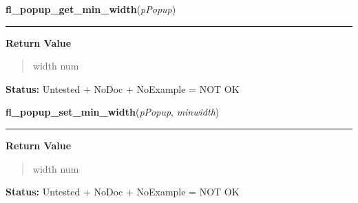     \label{xformslib:library:fl_popup_get_min_width}

    \vspace{0.5ex}

\hspace{.8\funcindent}\begin{boxedminipage}{\funcwidth}

    \raggedright \textbf{fl\_popup\_get\_min\_width}(\textit{pPopup})

    \vspace{-1.5ex}

    \rule{\textwidth}{0.5\fboxrule}
\setlength{\parskip}{2ex}
\setlength{\parskip}{1ex}
      \textbf{Return Value}
    \vspace{-1ex}

      \begin{quote}
      width num

      \end{quote}

\textbf{Status:} Untested + NoDoc + NoExample = NOT OK



    \end{boxedminipage}

    \label{xformslib:library:fl_popup_set_min_width}

    \vspace{0.5ex}

\hspace{.8\funcindent}\begin{boxedminipage}{\funcwidth}

    \raggedright \textbf{fl\_popup\_set\_min\_width}(\textit{pPopup}, \textit{minwidth})

    \vspace{-1.5ex}

    \rule{\textwidth}{0.5\fboxrule}
\setlength{\parskip}{2ex}
\setlength{\parskip}{1ex}
      \textbf{Return Value}
    \vspace{-1ex}

      \begin{quote}
      width num

      \end{quote}

\textbf{Status:} Untested + NoDoc + NoExample = NOT OK



    \end{boxedminipage}

